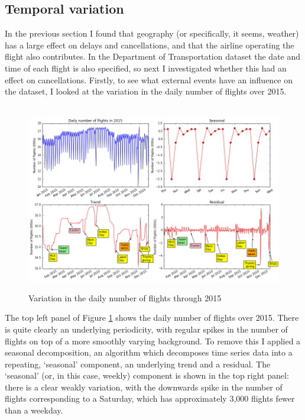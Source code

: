 \documentclass[a4paper]{article}
\begin{document}
\subsection*{Temporal variation}
In the previous section I found that geography (or specifically, it seems, weather) has a large effect on delays and cancellations, and that the airline operating the flight also contributes. In the Department of Transportation dataset the date and time of each flight is also specified, so next I investigated whether this had an effect on cancellations. Firstly, to see what external events have an influence on the dataset, I looked at the variation in the daily number of flights over 2015.

\begin{figure}[h]
\centering
\hbox{\hspace{-0.5in}
\includegraphics[width=1.1\textwidth]{../figures/exploration/num_flights_year.png}}
\caption{Variation in the daily number of flights through 2015}
\label{numflightsyear}
\end{figure}

The top left panel of Figure \ref{numflightsyear} shows the daily number of flights over 2015. There is quite clearly an underlying periodicity, with regular spikes in the number of flights on top of a more smoothly varying background. To remove this I applied a seasonal decomposition, an algorithm which decomposes time series data into a repeating, `seasonal' component, an underlying trend and a residual\footnotemark[7]. The `seasonal' (or, in this case, weekly) component is shown in the top right panel: there is a clear weakly variation, with the downwards spike in the number of flights corresponding to a Saturday, which has approximately 3,000 flights fewer than a weekday.
\end{document}
